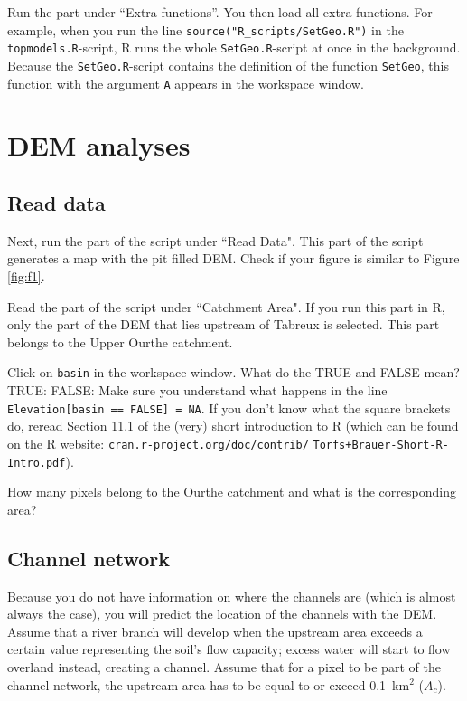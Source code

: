 \documentclass[twocolumn, 10pt, a4paper]{article}
\newenvironment{PC_prac_environment}{
\def\Q{\noindent \color{Gray}\rule[-0.1cm]{\columnwidth}{1.5pt}  \color{black} } \let\ques\Q 
\def\nQ{\noindent \color{black} } \let\ques\nQ 
\def\E{\color{Gray}\rule[0.3cm]{\columnwidth}{1.5pt} \color{black}} \let\ques\E }
\newcommand{\A}[2] { \ifthenelse{\boolean{showanswer}} {\noindent \color{cyan}{#2}\color{black}} {\multido{}{#1}{\noindent \color{light-gray}\hrulefill\\} } }
\begin{document}
\begin{PC_prac_environment}
Run the part under ``Extra functions''. You then load all extra functions. For example, when you run the line \verb!source("R_scripts/SetGeo.R")! in the \verb!topmodels.R!-script, R runs the whole \texttt{SetGeo.R}-script at once in the background. Because the \verb!SetGeo.R!-script contains the definition of the function \texttt{SetGeo}, this function with the argument \texttt{A} appears in the workspace window. 

\vspace{0.1cm}
\section{DEM analyses}

\subsection{Read data}
Next, run the part of the script under ``Read Data". This part of the script generates a map with the pit filled DEM. Check if your figure is similar to Figure \ref{fig:f1}.

Read the part of the script under ``Catchment Area". If you run this part in R, only the part of the DEM that lies upstream of Tabreux is selected. This part belongs to the Upper Ourthe catchment. 

\Q Click on \texttt{basin} in the workspace window. What do the TRUE and FALSE mean?\\
TRUE: 
FALSE: 
\E
Make sure you understand what happens in the line \texttt{Elevation[basin == FALSE] = NA}. If you don't know what the square brackets do, reread Section 11.1 of the (very) short introduction to R (which can be found on the R website: \texttt{cran.r-project.org/doc/contrib/} \texttt{Torfs+Brauer-Short-R-Intro.pdf}).

\Q How many pixels belong to the Ourthe catchment and what is the corresponding area?\\
\E

\vspace{-3mm}
\subsection{Channel network}
\label{sec:channel_network}
Because you do not have information on where the channels are (which is almost always the case), you will predict the location of the channels with the DEM. Assume that a river branch will develop when the upstream area exceeds a certain value representing the soil's flow capacity; excess water will start to flow overland instead, creating a channel. Assume that for a pixel to be part of the channel network, the upstream area has to be equal to or exceed 0.1~km$^2$ ($A_c$). 


\end{PC_prac_environment}
\end{document}
